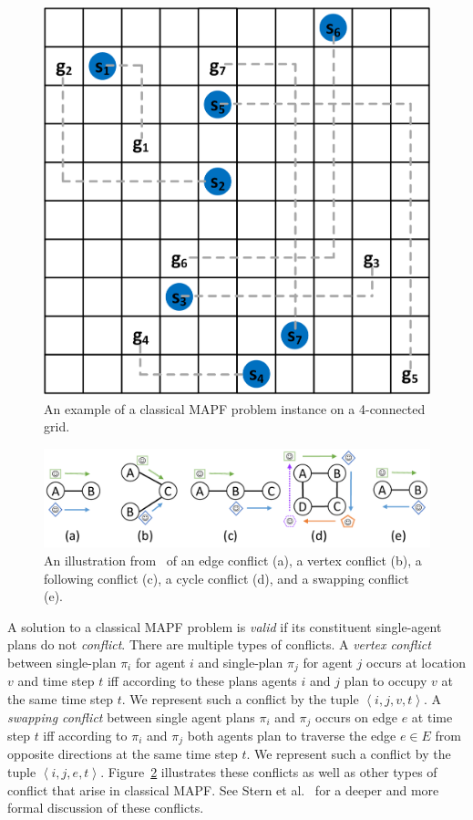 \documentclass[review]{elsarticle}
\newcommand{\tuple}[1]{\ensuremath{\left \langle #1 \right \rangle }}
\begin{document}
\begin{figure}
    \centering
    \includegraphics[width=0.5\linewidth]{classical-mapf-grid-example.png}
    \caption{An example of a classical MAPF problem instance on a 4-connected grid.}
    \label{fig:classical-mapf}
\end{figure}

\begin{figure}
    \centering
    \includegraphics[width=\columnwidth]{types-of-conflicts.pdf}
    \caption{An illustration from~\cite{stern2019mapf} of an edge conflict (a), a vertex conflict (b), a following conflict (c), a cycle conflict (d), and a swapping conflict (e).}
    \label{fig:types-of-conflicts}
\end{figure}

A solution to a classical MAPF problem is \emph{valid} if its constituent single-agent plans do not \emph{conflict}. 
There are multiple types of conflicts. 
A \emph{vertex conflict} between single-plan $\pi_i$ for agent $i$ 
and single-plan $\pi_j$ for agent $j$ occurs at location $v$ and time step $t$ iff according to these plans agents $i$ and $j$ plan to occupy $v$ at the same time step $t$. We represent such a conflict by the tuple $\tuple{i,j,v,t}$. 
A \emph{swapping conflict} between single agent plans $\pi_i$ and $\pi_j$ occurs on edge $e$ at time step $t$ iff according to $\pi_i$ and $\pi_j$ both agents plan to traverse the edge $e\in E$ from opposite directions at the same time step $t$. We represent such a conflict by the tuple $\tuple{i,j,e,t}$. 
Figure~\ref{fig:types-of-conflicts} illustrates these conflicts as well as other types of conflict that arise in classical MAPF. See Stern et al.~\cite{stern2019mapf} for a deeper and more formal discussion of these conflicts. 
\end{document}
